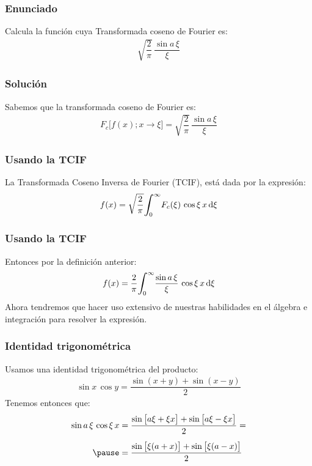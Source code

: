 \documentclass[12pt]{beamer}
\begin{document}
\begin{frame}
\frametitle{Enunciado}
Calcula la función cuya Transformada coseno de Fourier es:
\pause
\begin{align*}
\sqrt{\dfrac{2}{\pi}} \, \dfrac{\sin a \, \xi}{\xi}
\end{align*}
\end{frame}
\begin{frame}
\frametitle{Solución}
Sabemos que la transformada coseno de Fourier es:
\pause
\begin{align*}
F_{c} \big[ f (x); x \to \xi \big] = \sqrt{\dfrac{2}{\pi}} \, \dfrac{\sin a \, \xi}{\xi}
\end{align*}
\end{frame}
\begin{frame}
\frametitle{Usando la TCIF}
La Transformada Coseno Inversa de Fourier (TCIF), está dada por la expresión:
\pause
\begin{align*}
f (x) = \sqrt{\dfrac{2}{\pi}} \scaleint{6ex}_{\bs 0}^{\infty} F_{c} (\xi) \, \cos \xi \, x \dd{\xi}
\end{align*}
\end{frame}
\begin{frame}
\frametitle{Usando la TCIF}
Entonces por la definición anterior:
\pause
\begin{align*}
f (x) = \dfrac{2}{\pi} \scaleint{6ex}_{\bs 0}^{\infty} \dfrac{\sin a \, \xi}{\xi} \, \cos \xi \, x \dd{\xi}
\end{align*}
\pause
Ahora tendremos que hacer uso extensivo de nuestras habilidades en el álgebra e integración para resolver la expresión.
\end{frame}
\begin{frame}
\frametitle{Identidad trigonométrica}
Usamos una identidad trigonométrica del producto:
\pause
\begin{align*}
\sin x \, \cos y = \dfrac{\sin (x + y) + \sin (x - y)}{2}
\end{align*}
\pause
Tenemos entonces que:
\begin{eqnarray*}
\begin{aligned}
\sin a \, \xi \, \cos \xi \, x &= \dfrac{\sin \big[ a \xi + \xi x \big] + \sin \big[ a \xi - \xi x \big]}{2} = \\[0.5em] \pause
&= \dfrac{\sin \big[ \xi (a + x) \big] + \sin \big[ \xi (a - x) \big]}{2}
\end{aligned}
\end{eqnarray*}
\end{frame}
\end{document}
